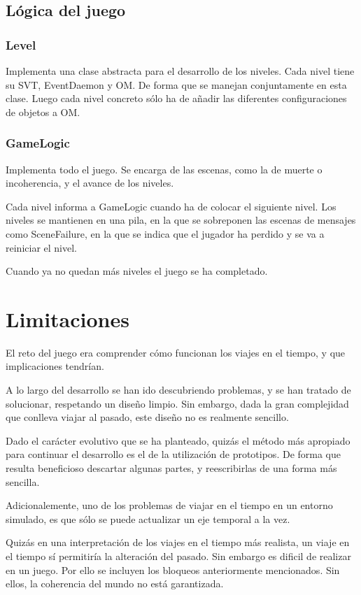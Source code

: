 \documentclass[11pt,a4paper]{article}
\begin{document}
\subsection{Lógica del juego}

\subsubsection{Level}
Implementa una clase abstracta para el desarrollo de los niveles. Cada nivel 
tiene su SVT, EventDaemon y OM. De forma que se manejan conjuntamente en esta 
clase. Luego cada nivel concreto sólo ha de añadir las diferentes 
configuraciones de objetos a OM.

\subsubsection{GameLogic}

Implementa todo el juego. Se encarga de las escenas, como la de muerte o 
incoherencia, y el avance de los niveles.

Cada nivel informa a GameLogic cuando ha de colocar el siguiente nivel. Los 
niveles se mantienen en una pila, en la que se sobreponen las escenas de 
mensajes como SceneFailure, en la que se indica que el jugador ha perdido y se 
va a reiniciar el nivel.

Cuando ya no quedan más niveles el juego se ha completado.

\section{Limitaciones}
El reto del juego era comprender cómo funcionan los viajes en el tiempo, y que 
implicaciones tendrían.

A lo largo del desarrollo se han ido descubriendo problemas, y se han tratado de 
solucionar, respetando un diseño limpio. Sin embargo, dada la gran complejidad 
que conlleva viajar al pasado, este diseño no es realmente sencillo.

Dado el carácter evolutivo que se ha planteado, quizás el método más apropiado 
para continuar el desarrollo es el de la utilización de prototipos. De forma que 
resulta beneficioso descartar algunas partes, y reescribirlas de una forma más 
sencilla.

Adicionalemente, uno de los problemas de viajar en el tiempo en un entorno 
simulado, es que sólo se puede actualizar un eje temporal a la vez.

Quizás en una interpretación de los viajes en el tiempo más realista, un viaje 
en el tiempo sí permitiría la alteración del pasado. Sin embargo es dificil de 
realizar en un juego. Por ello se incluyen los bloqueos anteriormente 
mencionados. Sin ellos, la coherencia del mundo no está garantizada.
\end{document}
